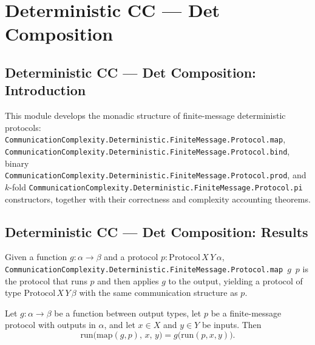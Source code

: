 \section{Deterministic CC --- Det Composition}
\subsection*{Deterministic CC --- Det Composition: Introduction}

This module develops the monadic structure of finite-message deterministic protocols:
\texttt{CommunicationComplexity.Deterministic.FiniteMessage.Protocol.map}, \texttt{CommunicationComplexity.Deterministic.FiniteMessage.Protocol.bind}, binary \texttt{CommunicationComplexity.Deterministic.FiniteMessage.Protocol.prod}, and $k$-fold \texttt{CommunicationComplexity.Deterministic.FiniteMessage.Protocol.pi} constructors,
together with their correctness and complexity accounting theorems.

\subsection*{Deterministic CC --- Det Composition: Results}

\begin{definition}
\label{CommunicationComplexity.Deterministic.FiniteMessage.Protocol.map}
\leanok
{}
Given a function $g : \alpha \to \beta$ and a protocol $p : \mathrm{Protocol}\,X\,Y\,\alpha$,
\texttt{CommunicationComplexity.Deterministic.FiniteMessage.Protocol.map}~$g$~$p$ is the protocol that runs $p$ and then applies $g$ to the output,
yielding a protocol of type $\mathrm{Protocol}\,X\,Y\,\beta$ with the same communication
structure as $p$.
\end{definition}

\begin{theorem}
\label{CommunicationComplexity.Deterministic.FiniteMessage.Protocol.map_run}
\leanok
{}
Let $g : \alpha \to \beta$ be a function between output types, let $p$ be a
finite-message protocol with outputs in $\alpha$, and let $x \in X$ and $y \in Y$ be
inputs. Then \[ \mathrm{run}\bigl(\mathrm{map}(g, p),\, x,\, y\bigr) =
g\bigl(\mathrm{run}(p, x, y)\bigr). \]
\end{theorem}

